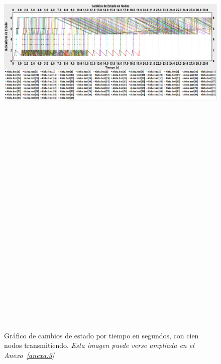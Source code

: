 \begin{justify}
\begin{figure}[!ht]
\includegraphics[width=13cm,height=30cm,keepaspectratio]{images/cambioestado100nodos.eps}
\caption{Gráfico de cambios de estado por tiempo en segundos, con cien nodos transmitiendo. \textit{Esta imagen puede verse ampliada en el Anexo~\ref{anexa:3}}}
\label{prueba:3}
\end{figure}

\end{justify}
